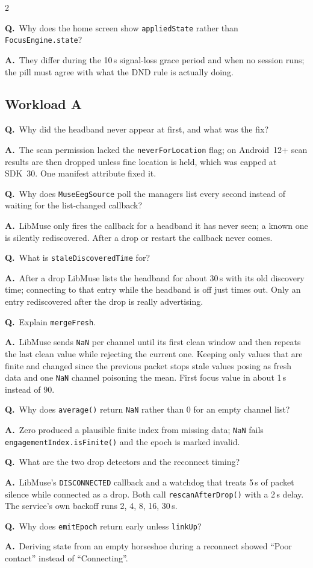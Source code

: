 \documentclass[10pt,a4paper]{article}
\newcommand{\code}[1]{\texttt{#1}}                  %
\newcounter{qnum}
\newcommand{\Q}[2]{\stepcounter{qnum}\par\medskip\noindent
  \textbf{Q\theqnum.}\ #1\par\nobreak\smallskip\noindent
  {\color{teal}\textbf{A.}}\ #2\par}
\begin{document}
\begin{multicols}{2}
\Q{Why does the home screen show \code{appliedState} rather than \code{FocusEngine.state}?}{They
differ during the 10\,s signal-loss grace period and when no session runs; the pill must agree
with what the DND rule is actually doing.}

\subsection*{Workload A}

\Q{Why did the headband never appear at first, and what was the fix?}{The scan permission
lacked the \code{neverForLocation} flag; on Android~12+ scan results are then dropped
unless fine location is held, which was capped at SDK~30. One manifest attribute fixed it.}

\Q{Why does \code{MuseEegSource} poll the manager\textquotesingle s list every second instead of waiting for
the list-changed callback?}{LibMuse only fires the callback for a headband it has never seen; a
known one is silently rediscovered. After a drop or restart the callback never comes.}

\Q{What is \code{staleDiscoveredTime} for?}{After a drop LibMuse lists the headband for about
30\,s with its old discovery time; connecting to that entry while the headband is off just times
out. Only an entry rediscovered after the drop is really advertising.}

\Q{Explain \code{mergeFresh}.}{LibMuse sends \code{NaN} per channel until its first clean window
and then repeats the last clean value while rejecting the current one. Keeping only values that
are finite and changed since the previous packet stops stale values posing as fresh data and one
\code{NaN} channel poisoning the mean. First focus value in about 1\,s instead of 90.}

\Q{Why does \code{average()} return \code{NaN} rather than 0 for an empty channel list?}{Zero
produced a plausible finite index from missing data; \code{NaN} fails
\code{engagementIndex.isFinite()} and the epoch is marked invalid.}

\Q{What are the two drop detectors and the reconnect timing?}{LibMuse's \code{DISCONNECTED}
callback and a watchdog that treats 5\,s of packet silence while connected as a drop. Both call
\code{rescanAfterDrop()} with a 2\,s delay. The service's own backoff runs 2, 4, 8, 16, 30\,s.}

\Q{Why does \code{emitEpoch} return early unless \code{linkUp}?}{Deriving state from an empty
horseshoe during a reconnect showed ``Poor contact'' instead of ``Connecting''.}


\end{multicols}
\end{document}
